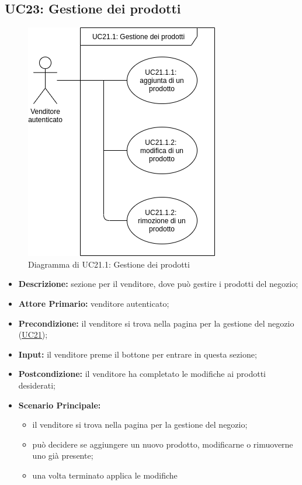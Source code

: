 \subsection{UC23: Gestione dei prodotti}
        \label{sec:UC23}
        \begin{figure}[!ht]
            \caption{Diagramma di UC21.1: Gestione dei prodotti}
            \vspace{10px}
            \includegraphics[scale=0.5]{../../../Images/AnalisiRequisiti/UC21.1}
            \centering
        \end{figure}
        \begin{itemize}
            \item \textbf{Descrizione:} sezione per il venditore, dove può gestire i prodotti del negozio;
            \item \textbf{Attore Primario:} venditore autenticato;
            \item \textbf{Precondizione:} il venditore si trova nella pagina per la gestione del negozio (\hyperref[sec:UC21]{\underline{UC21}});
            \item \textbf{Input:} il venditore preme il bottone per entrare in questa sezione;
            \item \textbf{Postcondizione:} il venditore ha completato le modifiche ai prodotti desiderati;
            \item \textbf{Scenario Principale:} 
                \begin{itemize}
                    \item il venditore si trova nella pagina per la gestione del negozio;
                    \item può decidere se aggiungere un nuovo prodotto, modificarne o rimuoverne uno già presente;
                    \item una volta terminato applica le modifiche
                \end{itemize}
        \end{itemize}
